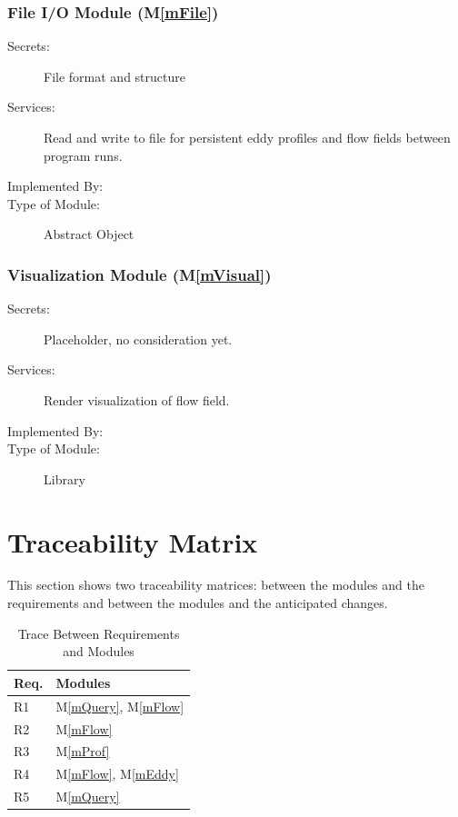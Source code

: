 \documentclass[12pt, titlepage]{article}
\newcommand{\mref}[1]{M\ref{#1}}
\begin{document}
\subsubsection{File I/O Module (\mref{mFile})}
\begin{description}
\item[Secrets:]File format and structure
\item[Services:]Read and write to file for persistent eddy profiles and flow fields between program runs.
\item[Implemented By:] \progname{}
\item[Type of Module:] Abstract Object
\end{description}

\subsubsection{Visualization Module (\mref{mVisual})}
\begin{description}
\item[Secrets:]Placeholder, no consideration yet.
\item[Services:]Render visualization of flow field.
\item[Implemented By:] \progname{}
\item[Type of Module:] Library
\end{description}

\section{Traceability Matrix} \label{SecTM}

This section shows two traceability matrices: between the modules and the
requirements and between the modules and the anticipated changes.

\begin{table}[H]
\centering
\begin{tabular}{p{} p{}}
\toprule
\textbf{Req.} & \textbf{Modules}\\
\midrule
R1 & \mref{mQuery}, \mref{mFlow}\\
R2 & \mref{mFlow}\\
R3 & \mref{mProf}\\
R4 & \mref{mFlow}, \mref{mEddy}\\
R5 & \mref{mQuery}\\
\bottomrule
\end{tabular}
\caption{Trace Between Requirements and Modules}
\label{TblRT}
\end{table}
\end{document}
